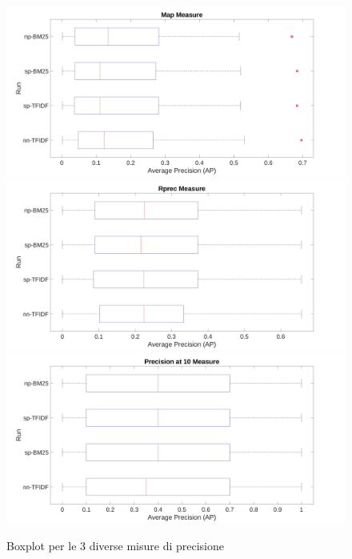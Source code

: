 \documentclass[a4paper, 11pt]{article}
\begin{document}
\begin{figure}[!htb]
  \includegraphics[width=\linewidth]{../Plots/mean-boxplot.jpeg}
\endminipage\hfill
{}
  \includegraphics[width=\linewidth]{../Plots/rprec-boxplot.jpeg}
\endminipage\hfill
{}%
  \includegraphics[width=\linewidth]{../Plots/p10-boxplot.jpeg}
\endminipage
\caption{Boxplot per le 3 diverse misure di precisione}
\end{figure}
\end{document}
